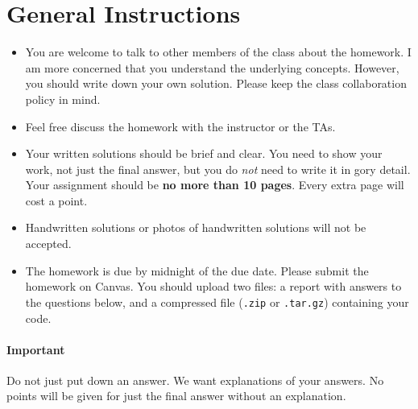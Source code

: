 \section*{General Instructions}

{\footnotesize
  \begin{itemize}
  \item You are welcome to talk to other members of the class about the
    homework. I am more concerned that you understand the underlying
    concepts. However, you should write down your own solution. Please keep the
    class collaboration policy in mind.

  \item Feel free discuss the homework with the instructor or the TAs.

  \item Your written solutions should be brief and clear. You need to show your
    work, not just the final answer, but you do \emph{not} need to write it in
    gory detail. Your assignment should be {\bf no more than 10 pages}. Every
    extra page will cost a point.

  \item Handwritten solutions or photos of handwritten solutions will not be accepted. 


  \item The homework is due by midnight of the due date. Please submit the
    homework on Canvas. You should upload two files: a report with answers to
    the questions below, and a compressed file (\texttt{.zip} or
    \texttt{.tar.gz}) containing your code.

  \end{itemize}
  \paragraph{Important} Do not just put down an answer. We want 
  explanations of your answers. No points will be given for just the final answer
  without an explanation.
  
}

